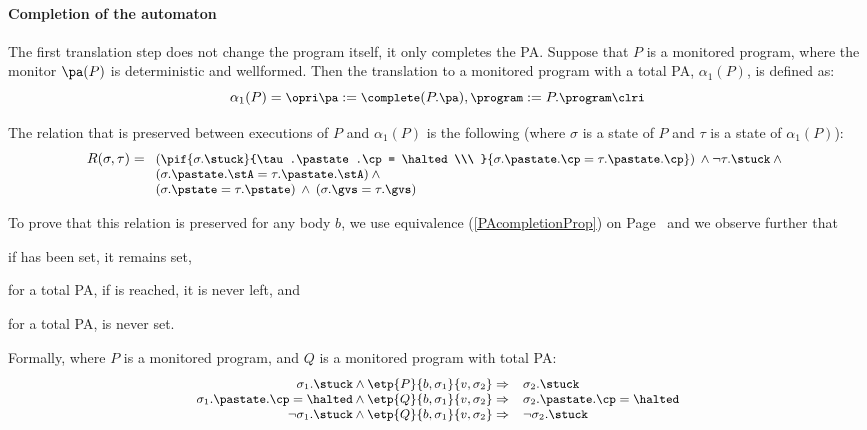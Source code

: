 \paragraph{Completion of the automaton}
The first translation step does not change the program itself, it only
completes the PA. Suppose that \(P\) is a monitored program, where the
monitor \(\pa(P)\) is deterministic and wellformed. Then the
translation to a monitored program with a total PA, \(\alpha_1(P)\),
is defined as:
\[{\small
\alpha_1(P) = \opri \pa := \complete(P.\pa), \program := P.\program
\clri
}
\]

The relation that is preserved between executions of \(P\) and
\(\alpha_1(P)\) is the following (where \(\sigma\) is a state of
\(P\) and \(\tau\) is a state of \(\alpha_1(P)\)):
\[{\small
R(\sigma, \tau) =\\
 \begin{array}[t]{l}
  (\pif {\sigma.\stuck}{\tau.\pastate.\cp = \halted\\\ }
        {\sigma.\pastate.\cp = \tau.\pastate.\cp}) \:\wedge
  \neg \tau.\stuck \:\wedge\\
  (\sigma.\pastate.\stA = \tau.\pastate.\stA) \:\wedge\\
  (\sigma.\pstate = \tau.\pstate) \:\wedge\: (\sigma.\gvs = \tau.\gvs)
\end{array}}
\]

To prove that this relation is preserved for any body \(b\), we
use equivalence (\ref{PAcompletionProp}) on
Page~\pageref{PAcompletionProp} and we observe further that
\begin{inparaenum}
\item if \stuck has been set, it remains set,
\item for a total PA, if  \halted is reached, it is never left, and
\item for a total PA, \stuck is never set.
\end{inparaenum} Formally, where \(P\) is a monitored program, and
\(Q\) is a monitored program with total PA:
\[{\small
\begin{array}[t]{rl}
\sigma_1.\stuck \wedge \etp{P}{b,\sigma_1}{v,\sigma_2} \Rightarrow &
\sigma_2.\stuck \\
\sigma_1.\pastate.\cp = \halted \wedge
\etp{Q}{b,\sigma_1}{v,\sigma_2} \Rightarrow &
\sigma_2.\pastate.\cp = \halted \\
\neg \sigma_1.\stuck \wedge \etp{Q}{b,\sigma_1}{v,\sigma_2} \Rightarrow &
\neg \sigma_2.\stuck
\end{array}}
\]


